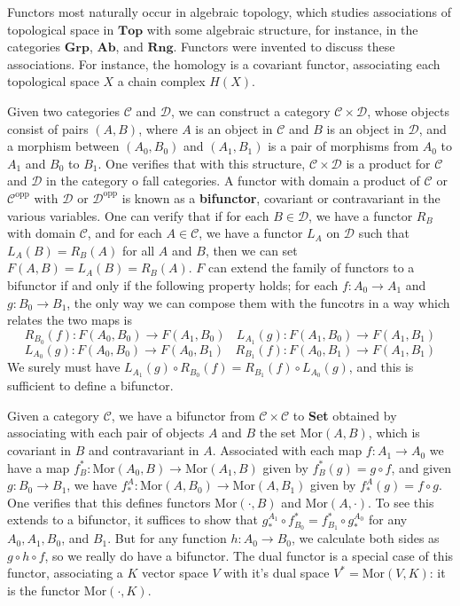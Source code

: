 \begin{example}
    Functors most naturally occur in algebraic topology, which studies associations of topological space in $\mathbf{Top}$ with some algebraic structure, for instance, in the categories $\mathbf{Grp}$, $\mathbf{Ab}$, and $\mathbf{Rng}$. Functors were invented to discuss these associations. For instance, the homology is a covariant functor, associating each topological space $X$ a chain complex $H(X)$.
\end{example}

Given two categories $\mathcal{C}$ and $\mathcal{D}$, we can construct a category $\mathcal{C} \times \mathcal{D}$, whose objects consist of pairs $(A,B)$, where $A$ is an object in $\mathcal{C}$ and $B$ is an object in $\mathcal{D}$, and a morphism between $(A_0, B_0)$ and $(A_1,B_1)$ is a pair of morphisms from $A_0$ to $A_1$ and $B_0$ to $B_1$. One verifies that with this structure, $\mathcal{C} \times \mathcal{D}$ is a product for $\mathcal{C}$ and $\mathcal{D}$ in the category o fall categories. A functor with domain a product of $\mathcal{C}$ or $\mathcal{C}^{\text{opp}}$ with $\mathcal{D}$ or $\mathcal{D}^{\text{opp}}$ is known as a {\bf bifunctor}, covariant or contravariant in the various variables. One can verify that if for each $B \in \mathcal{D}$, we have a functor $R_B$ with domain $\mathcal{C}$, and for each $A \in \mathcal{C}$, we have a functor $L_A$ on $\mathcal{D}$ such that $L_A(B) = R_B(A)$ for all $A$ and $B$, then we can set $F(A,B) = L_A(B) = R_B(A)$. $F$ can extend the family of functors to a bifunctor if and only if the following property holds; for each $f: A_0 \to A_1$ and $g: B_0 \to B_1$, the only way we can compose them with the funcotrs in a way which relates the two maps is
%
\[ R_{B_0}(f): F(A_0,B_0) \to F(A_1,B_0)\ \ \ \ L_{A_1}(g): F(A_1,B_0) \to F(A_1,B_1) \]
\[ L_{A_0}(g): F(A_0,B_0) \to F(A_0,B_1)\ \ \ \ R_{B_1}(f): F(A_0,B_1) \to F(A_1,B_1) \]
%
We surely must have $L_{A_1}(g) \circ R_{B_0}(f) = R_{B_1}(f) \circ L_{A_0}(g)$, and this is sufficient to define a bifunctor.

\begin{example}
    Given a category $\mathcal{C}$, we have a bifunctor from $\mathcal{C} \times \mathcal{C}$ to {\bf Set} obtained by associating with each pair of objects $A$ and $B$ the set $\text{Mor}(A,B)$, which is covariant in $B$ and contravariant in $A$. Associated with each map $f: A_1 \to A_0$ we have a map $f^*_B: \text{Mor}(A_0,B) \to \text{Mor}(A_1,B)$ given by $f^*_B(g) = g \circ f$, and given $g: B_0 \to B_1$, we have $f_*^A: \text{Mor}(A,B_0) \to \text{Mor}(A,B_1)$ given by $f_*^A(g) = f \circ g$. One verifies that this defines functors $\text{Mor}(\cdot,B)$ and $\text{Mor}(A,\cdot)$. To see this extends to a bifunctor, it suffices to show that $g_*^{A_1} \circ f^*_{B_0} = f^*_{B_1} \circ g_*^{A_0}$ for any $A_0,A_1,B_0$, and $B_1$. But for any function $h: A_0 \to B_0$, we calculate both sides as $g \circ h \circ f$, so we really do have a bifunctor. The dual functor is a special case of this functor, associating a $K$ vector space $V$ with it's dual space $V^* = \text{Mor}(V,K)$: it is the functor $\text{Mor}(\cdot,K)$.
\end{example}

